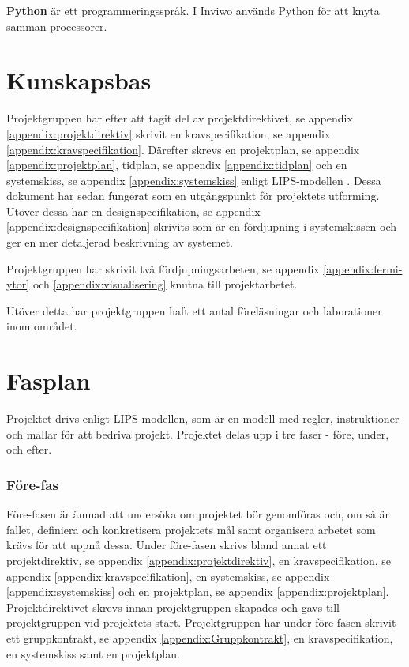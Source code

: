 \documentclass[a4paper,12pt]{article}
\begin{document}
\textbf{Python} är ett programmeringsspråk.
\cite{Python}
\newline
I Inviwo används Python för att knyta samman processorer.

\section{Kunskapsbas}
\label{kunskapsbas}
Projektgruppen har efter att tagit del av projektdirektivet, se appendix \ref{appendix:projektdirektiv}
skrivit en kravspecifikation, se appendix \ref{appendix:kravspecifikation}. Därefter skrevs en projektplan, se appendix \ref{appendix:projektplan}, tidplan, se appendix \ref{appendix:tidplan} och en  systemskiss, se appendix \ref{appendix:systemskiss} enligt LIPS-modellen \cite{LIPS}. 
Dessa dokument har sedan fungerat som en utgångspunkt för projektets utforming. Utöver dessa har en designspecifikation, se appendix \ref{appendix:designspecifikation} skrivits som är en fördjupning i systemskissen och ger en mer detaljerad beskrivning av systemet.

Projektgruppen har skrivit två fördjupningsarbeten, se appendix \ref{appendix:fermi-ytor} och \ref{appendix:visualisering} knutna till projektarbetet.

Utöver detta har projektgruppen haft ett antal föreläsningar och laborationer inom området.

\section{Fasplan}
Projektet drivs enligt LIPS-modellen, som är en modell med regler, instruktioner och mallar för att bedriva projekt. Projektet delas upp i tre faser - före, under, och efter.

\subsubsection{Före-fas}
Före-fasen är ämnad att undersöka om projektet bör genomföras och, om så är fallet, definiera och konkretisera projektets mål samt organisera arbetet som krävs för att uppnå dessa. Under före-fasen skrivs bland annat ett projektdirektiv, se appendix \ref{appendix:projektdirektiv}, en kravspecifikation, se appendix \ref{appendix:kravspecifikation}, en systemskiss, se appendix \ref{appendix:systemskiss} och en projektplan, se appendix \ref{appendix:projektplan}. Projektdirektivet skrevs innan projektgruppen skapades och gavs till projektgruppen vid projektets start.
Projektgruppen har under före-fasen skrivit ett gruppkontrakt, se appendix \ref{appendix:Gruppkontrakt}, en kravspecifikation, en systemskiss samt en projektplan.
\end{document}
